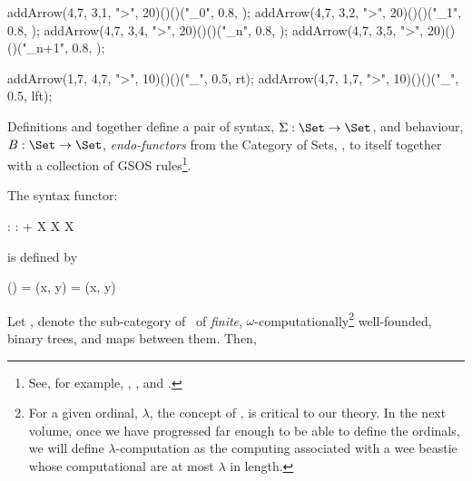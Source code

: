   addArrow(4,7, 3,1, ">", 20)()()("_0",     0.8, );
  addArrow(4,7, 3,2, ">", 20)()()("_1",     0.8, );
  addArrow(4,7, 3,4, ">", 20)()()("_n",     0.8, );
  addArrow(4,7, 3,5, ">", 20)()()("_{n+1}", 0.8, );
  
  addArrow(1,7, 4,7, ">", 10)()()("_{\infinity}", 0.5, rt);
  addArrow(4,7, 1,7, ">", 10)()()("_{\infinity}", 0.5, lft);

\stopMPcode \stopformula

\stopMMundi

\startMMundi


\stopMMundi

\startMMundi

Definitions \in[beastieActions] and \in[beastieTests] together define a 
pair of syntax, $\Sigma : \Set \rightarrow \Set$, and behaviour, $B : \Set 
\rightarrow \Set$, \emph{endo-functors} from the Category of Sets, \Set, 
to itself together with a collection of GSOS rules\footnote{See, for 
example, \cite{turiPlotkin1997operationalSemantics}, 
\cite{klin2011bialgebrasSOS}, and \cite{jacobs2017coalgebras}.}. 

The syntax functor: 

\placeformula[+]\startformula\startalign
  \NC \Sigma : \NC \Set \rightarrow \Set           \NR
  \NC \Sigma : \NC {} + X \times X \mapsto X \NR
\stopalign\stopformula

\noindent is defined by

\placeformula[+]\startformula\startalign
  \NC \Sigma(\star) \NC =         \NR
  \NC \Sigma(x, y)  \NC = (x, y) \NR
\stopalign\stopformula

\noindent Let \catWFLoL, denote the sub-category of \Set\ of 
\emph{finite}, $\omega$-computationally\footnote{For a given ordinal, 
$\lambda$, the concept of , is 
critical to our theory. In the next volume, once we have progressed far 
enough to be able to define the ordinals, we will define 
$\lambda$-computation as the computing  associated with a wee 
beastie whose computational  are at most $\lambda$ in 
length. } well-founded, binary trees, and maps between them. Then, 


